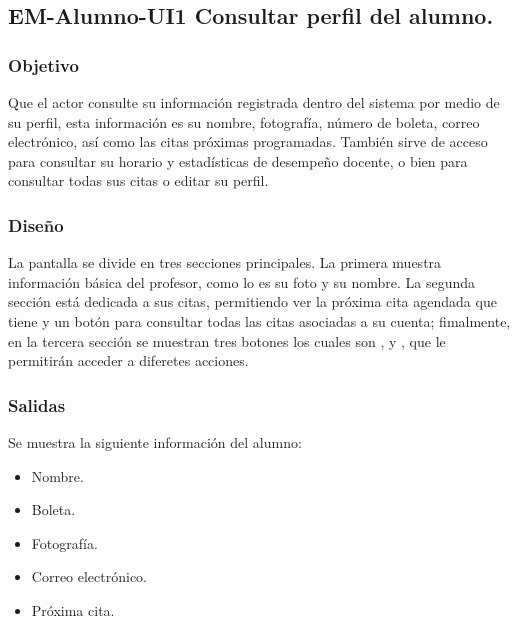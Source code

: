 





\subsection{EM-Alumno-UI1 Consultar perfil del alumno.}

\subsubsection{Objetivo}
	\noindent
	Que el actor consulte su información registrada dentro del sistema por medio de su perfil, esta información es su nombre, fotografía, número de boleta, correo electrónico, así como las citas próximas programadas. También sirve de acceso para consultar su horario y estadísticas de desempeño docente, o bien para consultar todas sus citas o editar su perfil.  

\subsubsection{Diseño}
	\noindent
	La pantalla se divide en tres secciones principales. La primera muestra información básica del profesor, como lo es su foto y su nombre. La segunda sección está dedicada a sus citas, permitiendo ver la próxima cita agendada que tiene y un botón para consultar todas las citas asociadas a su cuenta; fimalmente, en la tercera sección se muestran tres botones los cuales son ,  y , que le permitirán acceder a diferetes acciones. 

\pagebreak
{}

\subsubsection{Salidas}
	\noindent
	Se muestra la siguiente información del alumno:
	\begin{itemize}
		\item Nombre.
		\item Boleta.
		\item Fotografía.
		\item Correo electrónico.
		\item Próxima cita. 
	\end{itemize}


